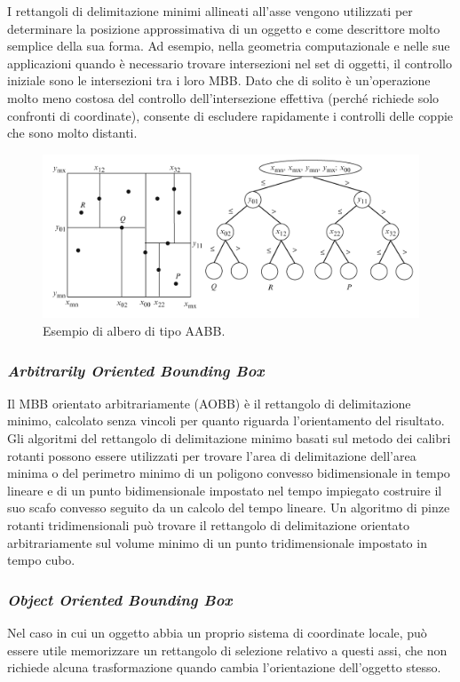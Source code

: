 I rettangoli di delimitazione minimi allineati all'asse vengono utilizzati per determinare la posizione approssimativa di un oggetto e come descrittore molto semplice della sua forma. Ad esempio, nella geometria computazionale e nelle sue applicazioni quando è necessario trovare intersezioni nel set di oggetti, il controllo iniziale sono le intersezioni tra i loro \ac{MBB}. Dato che di solito è un'operazione molto meno costosa del controllo dell'intersezione effettiva (perché richiede solo confronti di coordinate), consente di escludere rapidamente i controlli delle coppie che sono molto distanti.

\begin{figure}[h]
	\centering
	\includegraphics[width=\linewidth]{Figures/AABB}
	\caption{Esempio di albero di tipo AABB.}
	\label{AABB}
\end{figure}
%
\subsubsection{\textit{Arbitrarily Oriented Bounding Box}}
Il \ac{MBB} orientato arbitrariamente (\ac{AOBB}) è il rettangolo di delimitazione minimo, calcolato senza vincoli per quanto riguarda l'orientamento del risultato. Gli algoritmi del rettangolo di delimitazione minimo basati sul metodo dei calibri rotanti possono essere utilizzati per trovare l'area di delimitazione dell'area minima o del perimetro minimo di un poligono convesso bidimensionale in tempo lineare e di un punto bidimensionale impostato nel tempo impiegato costruire il suo scafo convesso seguito da un calcolo del tempo lineare. Un algoritmo di pinze rotanti tridimensionali può trovare il rettangolo di delimitazione orientato arbitrariamente sul volume minimo di un punto tridimensionale impostato in tempo cubo.
%
\subsubsection{\textit{Object Oriented Bounding Box}}
Nel caso in cui un oggetto abbia un proprio sistema di coordinate locale, può essere utile memorizzare un rettangolo di selezione relativo a questi assi, che non richiede alcuna trasformazione quando cambia l'orientazione dell'oggetto stesso.

